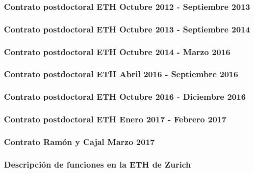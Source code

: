 \documentclass[a4paper, 11pt, twoside, openright]{report}
\begin{document}
\subsubsection{Contrato postdoctoral ETH Octubre 2012 - Septiembre 2013}


\subsubsection{Contrato postdoctoral ETH Octubre 2013 - Septiembre 2014}


\subsubsection{Contrato postdoctoral ETH Octubre 2014 - Marzo 2016}


\subsubsection{Contrato postdoctoral ETH Abril 2016 - Septiembre 2016}


\subsubsection{Contrato postdoctoral ETH Octubre 2016 - Diciembre 2016}


\subsubsection{Contrato postdoctoral ETH Enero 2017 - Febrero 2017}


\subsubsection{Contrato Ramón y Cajal Marzo 2017}


\subsubsection{Descripción de funciones en la ETH de Zurich}

\end{document}
